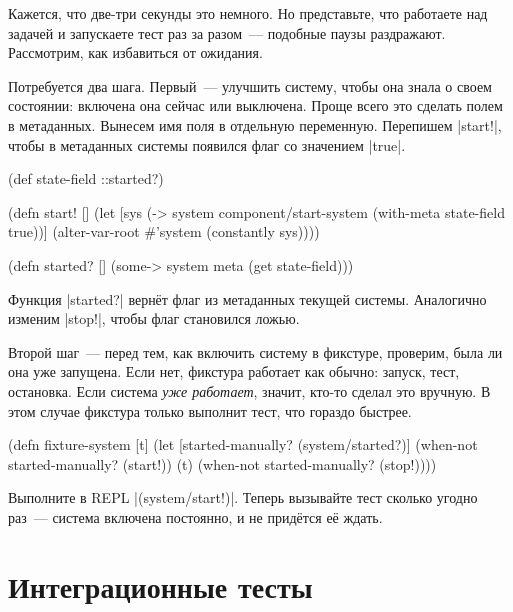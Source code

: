 Кажется, что две-три секунды это немного. Но представьте, что работаете над
задачей и запускаете тест раз за разом~--- подобные паузы
раздражают. Рассмотрим, как избавиться от ожидания.


Потребуется два шага. Первый~--- улучшить систему, чтобы она знала о своем
состоянии: включена она сейчас или выключена. Проще всего это сделать полем в
метаданных. Вынесем имя поля в отдельную переменную. Перепишем \spverb|start!|,
чтобы в метаданных системы появился флаг со значением \spverb|true|.

\begin{english}
  \begin{clojure}
(def state-field ::started?)

(defn start! []
  (let [sys (-> system
                component/start-system
                (with-meta {state-field true}))]
    (alter-var-root #'system (constantly sys))))

(defn started? []
  (some-> system meta (get state-field)))
  \end{clojure}
\end{english}

Функция \spverb|started?| вернёт флаг из метаданных текущей системы. Аналогично
изменим \spverb|stop!|, чтобы флаг становился ложью.

Второй шаг~--- перед тем, как включить систему в фикстуре, проверим, была ли она
уже запущена. Если нет, фикстура работает как обычно: запуск, тест,
остановка. Если система \emph{уже работает}, значит, кто-то сделал это
вручную. В этом случае фикстура только выполнит тест, что гораздо быстрее.

\begin{english}
  \begin{clojure}
(defn fixture-system [t]
  (let [started-manually? (system/started?)]
    (when-not started-manually?
      (start!))
    (t)
    (when-not started-manually?
      (stop!))))
  \end{clojure}
\end{english}

Выполните в REPL \spverb|(system/start!)|. Теперь вызывайте тест сколько угодно
раз~--- система включена постоянно, и не придётся её ждать.

\section{Интеграционные тесты}

